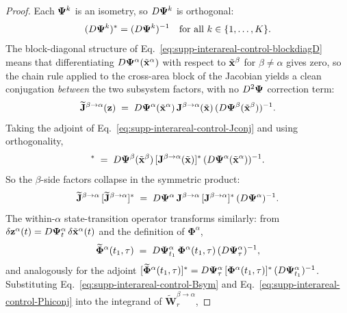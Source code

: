 \begin{proof}
Each $\vb{\Psi}^{k}$ is an isometry, so $D\vb{\Psi}^{k}$ is orthogonal:
\begin{equation}
(D\vb{\Psi}^{k})^{*}=(D\vb{\Psi}^{k})^{-1}\quad\text{for all }k\in\{1,\ldots,K\}.
\end{equation}
The block-diagonal structure of Eq.~\ref{eq:supp-interareal-control-blockdiagD} means that differentiating $D\vb{\Psi}^{\alpha}(\tilde{\vb{x}}^{\alpha})$ with respect to $\tilde{\vb{x}}^{\beta}$ for $\beta\neq\alpha$ gives zero, so the chain rule applied to the cross-area block of the Jacobian yields a clean conjugation \emph{between} the two subsystem factors, with no $D^{2}\vb{\Psi}$ correction term:
\begin{equation}
\widetilde{\mathbf{J}}^{\beta\to\alpha}(\vb{z}) \;=\; D\vb{\Psi}^{\alpha}(\tilde{\vb{x}}^{\alpha})\,\mathbf{J}^{\beta\to\alpha}(\tilde{\vb{x}})\,(D\vb{\Psi}^{\beta}(\tilde{\vb{x}}^{\beta}))^{-1}.\label{eq:supp-interareal-control-Jconj}
\end{equation}
Taking the adjoint of Eq.~\ref{eq:supp-interareal-control-Jconj} and using orthogonality,
\begin{equation}
[\widetilde{\mathbf{J}}^{\beta\to\alpha}(\vb{z})]^{*} \;=\; D\vb{\Psi}^{\beta}(\tilde{\vb{x}}^{\beta})\,[\mathbf{J}^{\beta\to\alpha}(\tilde{\vb{x}})]^{*}\,(D\vb{\Psi}^{\alpha}(\tilde{\vb{x}}^{\alpha}))^{-1}.
\end{equation}
So the $\beta$-side factors collapse in the symmetric product:
\begin{equation}
\widetilde{\mathbf{J}}^{\beta\to\alpha}\,[\widetilde{\mathbf{J}}^{\beta\to\alpha}]^{*} \;=\; D\vb{\Psi}^{\alpha}\,\mathbf{J}^{\beta\to\alpha}\,[\mathbf{J}^{\beta\to\alpha}]^{*}\,(D\vb{\Psi}^{\alpha})^{-1}. \label{eq:supp-interareal-control-Bsym}
\end{equation}
The within-$\alpha$ state-transition operator transforms similarly: from $\delta\vb{z}^{\alpha}(t)=D\vb{\Psi}^{\alpha}_{t}\,\delta\tilde{\vb{x}}^{\alpha}(t)$ and the definition of $\mathbf{\Phi}^{\alpha}$,
\begin{equation}
\widetilde{\mathbf{\Phi}}^{\alpha}(t_{1},\tau) \;=\; D\vb{\Psi}^{\alpha}_{t_{1}}\,\mathbf{\Phi}^{\alpha}(t_{1},\tau)\,(D\vb{\Psi}^{\alpha}_{\tau})^{-1},\label{eq:supp-interareal-control-Phiconj}
\end{equation}
and analogously for the adjoint $[\widetilde{\mathbf{\Phi}}^{\alpha}(t_{1},\tau)]^{*}=D\vb{\Psi}^{\alpha}_{\tau}\,[\mathbf{\Phi}^{\alpha}(t_{1},\tau)]^{*}\,(D\vb{\Psi}^{\alpha}_{t_{1}})^{-1}$. Substituting Eq.~\ref{eq:supp-interareal-control-Bsym} and Eq.~\ref{eq:supp-interareal-control-Phiconj} into the integrand of $\widetilde{\mathbf{W}}_{r}^{\beta\to\alpha}$,

\end{proof}
